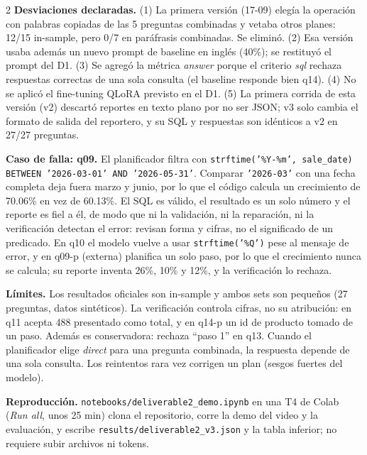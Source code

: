 \documentclass[10pt]{article}
\newcommand{\head}[1]{\textbf{\color{ucblue}#1}\hspace{0.4em}}
\begin{document}
\begin{multicols}{2}
\head{Desviaciones declaradas.} (1) La primera versi\'on (17-09) eleg\'ia la operaci\'on con
palabras copiadas de las 5 preguntas combinadas y vetaba otros planes: 12/15 in-sample, pero 0/7
en par\'afrasis combinadas. Se elimin\'o. (2) Esa versi\'on usaba adem\'as un nuevo prompt de
baseline en ingl\'es (40\%); se restituy\'o el prompt del D1. (3) Se agreg\'o la m\'etrica
\textit{answer} porque el criterio \textit{sql} rechaza respuestas correctas de una sola consulta
(el baseline responde bien q14). (4) No se aplic\'o el fine-tuning QLoRA previsto en el D1.
(5) La primera corrida de esta versi\'on (v2) descart\'o reportes en texto plano por no ser JSON;
v3 solo cambia el formato de salida del reportero, y su SQL y respuestas son id\'enticos a v2 en
27/27 preguntas.

\head{Caso de falla: q09.} El planificador filtra con \texttt{strftime('\%Y-\%m', sale\_date)
BETWEEN '2026-03-01' AND '2026-05-31'}. Comparar \texttt{'2026-03'} con una fecha completa deja
fuera marzo y junio, por lo que el c\'odigo calcula un crecimiento de 70.06\% en vez de 60.13\%.
El SQL es v\'alido, el resultado es un solo n\'umero y el reporte es fiel a \'el, de modo que ni
la validaci\'on, ni la reparaci\'on, ni la verificaci\'on detectan el error: revisan forma y
cifras, no el significado de un predicado. En q10 el modelo vuelve a usar
\texttt{strftime('\%Q')} pese al mensaje de error, y en q09-p (externa) planifica un solo paso,
por lo que el crecimiento nunca se calcula; su reporte inventa 26\%, 10\% y 12\%, y la
verificaci\'on lo rechaza.

\head{L\'imites.} Los resultados oficiales son in-sample y ambos sets son peque\~nos (27
preguntas, datos sint\'eticos). La verificaci\'on controla cifras, no su atribuci\'on: en q11
acepta 488 presentado como total, y en q14-p un id de producto tomado de un paso. Adem\'as es
conservadora: rechaza ``paso 1'' en q13. Cuando el planificador elige \textit{direct} para una
pregunta combinada, la respuesta depende de una sola consulta. Los reintentos rara vez corrigen
un plan (sesgos fuertes del modelo).

\head{Reproducci\'on.} \texttt{notebooks/deliverable2\_demo.ipynb} en una T4 de Colab
(\textit{Run all}, unos 25 min) clona el repositorio, corre la demo del video y la evaluaci\'on,
y escribe \texttt{results/deliverable2\_v3.json} y la tabla inferior; no requiere subir archivos
ni tokens.
\end{multicols}

\vspace{-4pt}
\begin{center}
\footnotesize

\end{center}
\end{document}
